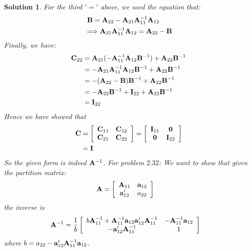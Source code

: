 \documentclass[11pt]{article}\usepackage[]{graphicx}\usepackage[]{color}
\newtheorem{sol}{Solution}
\begin{document}
\begin{sol}
	For the third $'='$ above, we used the equation that:
	\begin{align*}
		&\ {\bf B} = {\bf A}_{22} - {\bf A}_{21}{\bf A}_{11}^{-1}{\bf A}_{12}\\
		&\Longrightarrow {\bf A}_{21}{\bf A}_{11}^{-1}{\bf A}_{12} = {\bf A}_{22} - {\bf B}
	\end{align*}
	Finally, we have:
	\begin{align*}
		{\bf C}_{22} &= {\bf A}_{21}(-{\bf A}_{11}^{-1}{\bf A}_{12}{\bf B}^{-1}) + {\bf A}_{22}{\bf B}^{-1}\\
		&= -{\bf A}_{21}{\bf A}_{11}^{-1}{\bf A}_{12}{\bf B}^{-1} + {\bf A}_{22}{\bf B}^{-1}\\
		&= -({\bf A}_{22} - {\bf B}){\bf B}^{-1} + {\bf A}_{22}{\bf B}^{-1}\\
		&= -{\bf A}_{22}{\bf B}^{-1} + {\bf I}_{22} + {\bf A}_{22}{\bf B}^{-1}\\
		&= {\bf I}_{22}
	\end{align*}
	Hence we have showed that
	\begin{align*}
		{\bf C} &= \left[\begin{array}{cc} {\bf C}_{11}& {\bf C}_{12}\\ {\bf C}_{21}& {\bf C}_{22}\end{array}\right] = \left[\begin{array}{cc} {\bf I}_{11}& {\bf 0} \\ {\bf 0}& {\bf I}_{22}\end{array}\right]\\
		&= {\bf I}
	\end{align*}
	So the given form is indeed ${\bf A}^{-1}$.\vskip 2mm 
	For problem $2.32$:\vskip 2mm
	We want to show that given the partition matrix:
	\begin{align*}
		{\bf A} &= \left[\begin{array}{cc} {\bf A}_{11}& {\bf a}_{12}\\ {\bf a}'_{12}& a_{22}\end{array}\right]
	\end{align*}
	the inverse is
	\begin{align*}
		{\bf A}^{-1} &= \frac{1}{b}\left[\begin{array}{cc} b{\bf A}_{11}^{-1} + {\bf A}_{11}^{-1}{\bf a}_{12}{\bf a}'_{12}{\bf A}_{11}^{-1}& -{\bf A}_{11}^{-1}{\bf a}_{12}\\ -{\bf a}'_{12}{\bf A}_{11}^{-1}& 1\end{array}\right]
	\end{align*}
	where $b = a_{22} - {\bf a}_{12}'{\bf A}_{11}^{-1}{\bf a}_{12}$.\vskip 2mm

\end{sol}
\end{document}
